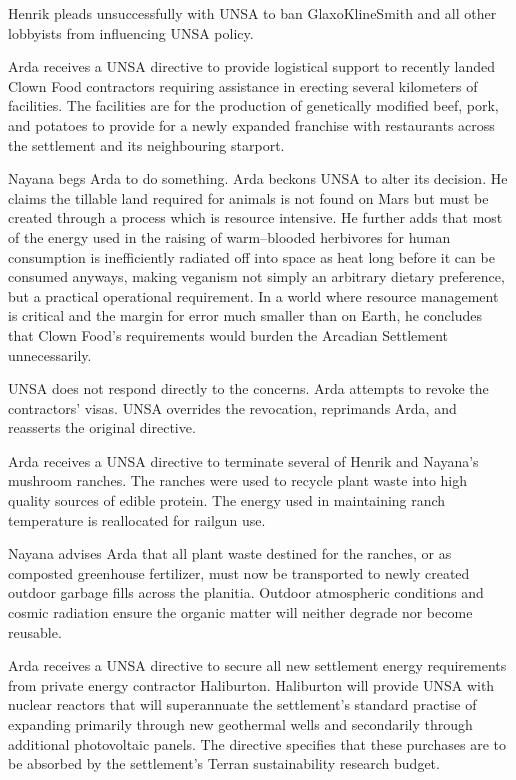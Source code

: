 Henrik pleads unsuccessfully with UNSA to ban GlaxoKlineSmith and all other lobbyists from influencing UNSA policy.
\StopTimelineDate

Arda receives a UNSA directive to provide logistical support to recently landed Clown Food contractors requiring assistance in erecting several kilometers of facilities. The facilities are for the production of genetically modified beef, pork, and potatoes to provide for a newly expanded franchise with restaurants across the settlement and its neighbouring starport.

Nayana begs Arda to do something. Arda beckons UNSA to alter its decision. He claims the tillable land required for animals is not found on Mars but must be created through a process which is resource intensive. He further adds that most of the energy used in the raising of warm--blooded herbivores for human consumption is inefficiently radiated off into space as heat long before it can be consumed anyways, making veganism not simply an arbitrary dietary preference, but a practical operational requirement. In a world where resource management is critical and the margin for error much smaller than on Earth, he concludes that Clown Food's requirements would burden the Arcadian Settlement unnecessarily. 

UNSA does not respond directly to the concerns. Arda attempts to revoke the contractors' visas. UNSA overrides the revocation, reprimands Arda, and reasserts the original directive.
\StopTimelineDate

Arda receives a UNSA directive to terminate several of Henrik and Nayana's mushroom ranches. The ranches were used to recycle plant waste into high quality sources of edible protein. The energy used in maintaining ranch temperature is reallocated for railgun use. 

Nayana advises Arda that all plant waste destined for the ranches, or as composted greenhouse fertilizer, must now be transported to newly created outdoor garbage fills across the planitia. Outdoor atmospheric conditions and cosmic radiation ensure the organic matter will neither degrade nor become reusable.
\StopTimelineDate

Arda receives a UNSA directive to secure all new settlement energy requirements from private energy contractor Haliburton. Haliburton will provide UNSA with nuclear reactors that will superannuate the settlement's standard practise of expanding primarily through new geothermal wells and secondarily through additional photovoltaic panels. The directive specifies that these purchases are to be absorbed by the settlement's Terran sustainability research budget. 
\StopTimelineDate

